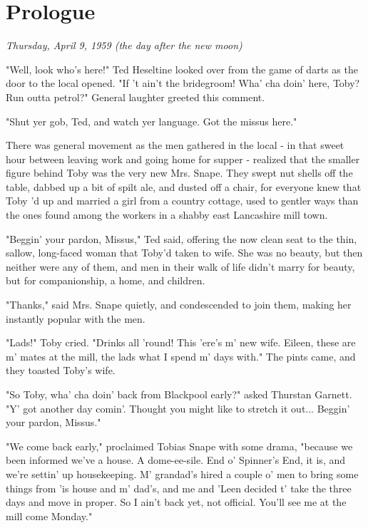 

\chapter{Prologue}

\emph{Thursday, April 9, 1959 (the day after the new moon)}

"Well, look who's here!" Ted Heseltine looked over from the game of darts as the door to the local opened. "If 't ain't the bridegroom! Wha' cha doin' here, Toby? Run outta petrol?" General laughter greeted this comment.

"Shut yer gob, Ted, and watch yer language. Got the missus here."

There was general movement as the men gathered in the local - in that sweet hour between leaving work and going home for supper - realized that the smaller figure behind Toby was the very new Mrs. Snape. They swept nut shells off the table, dabbed up a bit of spilt ale, and dusted off a chair, for everyone knew that Toby 'd up and married a girl from a country cottage, used to gentler ways than the ones found among the workers in a shabby east Lancashire mill town.

"Beggin' your pardon, Missus," Ted said, offering the now clean seat to the thin, sallow, long-faced woman that Toby'd taken to wife. She was no beauty, but then neither were any of them, and men in their walk of life didn't marry for beauty, but for companionship, a home, and children.

"Thanks," said Mrs. Snape quietly, and condescended to join them, making her instantly popular with the men.

"Lads!" Toby cried. "Drinks all 'round! This 'ere's m' new wife. Eileen, these are m' mates at the mill, the lads what I spend m' days with." The pints came, and they toasted Toby's wife.

"So Toby, wha' cha doin' back from Blackpool early?" asked Thurstan Garnett. "Y' got another day comin'. Thought you might like to stretch it out... Beggin' your pardon, Missus."

"We come back early," proclaimed Tobias Snape with some drama, "because we been informed we've a house. A dome-ee-sile. End o' Spinner's End, it is, and we're settin' up housekeeping. M' grandad's hired a couple o' men to bring some things from 'is house and m' dad's, and me and 'Leen decided t' take the three days and move in proper. So I ain't back yet, not official. You'll see me at the mill come Monday."


